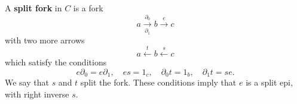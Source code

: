 A \textbf{split fork} in $C$ is a fork
$$a \xrightarrow[\partial_1]{\partial_0} b \xrightarrow{e} c$$
with two more arrows
$$a \xleftarrow{t} b \xleftarrow{s} c$$
which satisfy the conditions
$$e \partial_0 = e \partial_1, \quad es = 1_c, \quad \partial_0 t = 1_b, \quad \partial_1 t = se.$$
We say that $s$ and $t$ split the fork. These conditions imply that $e$ is a split epi, with right inverse $s$.
